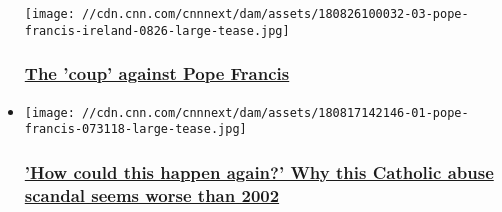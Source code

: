 \begin{itemize}
  \texttt{[image: //cdn.cnn.com/cnnnext/dam/assets/180826100032-03-pope-francis-ireland-0826-large-tease.jpg]}

  \hypertarget{the-coup-against-pope-francis-}{%
  \subsubsection{\texorpdfstring{\href{/2018/08/27/us/vigano-pope-resign-abuse-analysis/index.html}{The
  'coup' against Pope Francis
  }}{The 'coup' against Pope Francis }}\label{the-coup-against-pope-francis-}}
\item
  \href{/2018/08/19/us/catholic-sex-abuse-outrage/index.html}{}

  \texttt{[image: //cdn.cnn.com/cnnnext/dam/assets/180817142146-01-pope-francis-073118-large-tease.jpg]}

  \hypertarget{how-could-this-happen-again-why-this-catholic-abuse-scandal-seems-worse-than-2002-}{%
  \subsubsection{\texorpdfstring{\href{/2018/08/19/us/catholic-sex-abuse-outrage/index.html}{'How
  could this happen again?' Why this Catholic abuse scandal seems worse
  than 2002
  }}{'How could this happen again?' Why this Catholic abuse scandal seems worse than 2002 }}\label{how-could-this-happen-again-why-this-catholic-abuse-scandal-seems-worse-than-2002-}}
\end{itemize}

